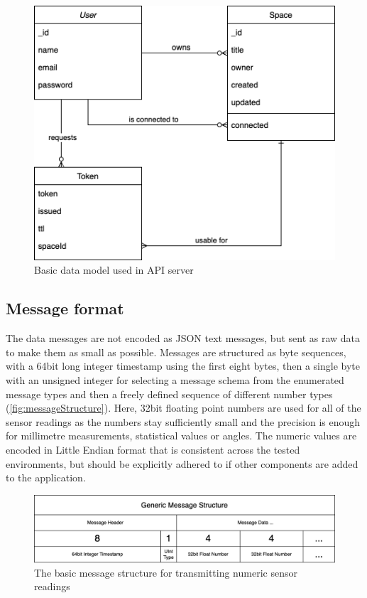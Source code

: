 \begin{figure}[h]
\centering
\includegraphics[scale=0.4]{04_Artefakte/01_Abbildungen/api-datamodel}
\caption[API data model]{Basic data model used in API server\protect}
\label{fig:apiDataModel}
\end{figure}

\subsection{Message format}

The data messages are not encoded as \ac{JSON} text messages, but sent as raw data to make them as small as possible. Messages are structured as byte sequences, with a 64bit long integer timestamp using the first eight bytes, then a single byte with an unsigned integer for selecting a message schema from the enumerated message types and then a freely defined sequence of different number types (\autoref{fig:messageStructure}). Here, 32bit floating point numbers are used for all of the sensor readings as the numbers stay sufficiently small and the precision is enough for millimetre measurements, statistical values or angles. The numeric values are encoded in Little Endian format that is consistent across the tested environments, but should be explicitly adhered to if other components are added to the application.

\begin{figure}[h]
\centering
\includegraphics[width=\textwidth]{04_Artefakte/01_Abbildungen/generic-message-structure}
\caption[Generic Message Structure]{The basic message structure for transmitting numeric sensor readings\protect}
\label{fig:messageStructure}
\end{figure}

